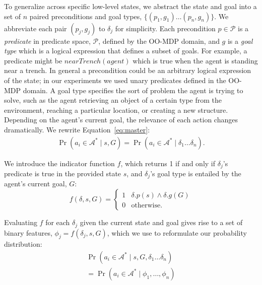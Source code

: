 \documentclass[letterpaper]{article}
\begin{document}
To generalize across specific low-level states, we abstract the state
and goal into a set of $n$ paired preconditions and goal types, $\{
(p_1, g_1) \ldots (p_{n}, g_{n}) \}$. We abbreviate each pair $(p_j,
g_j)$ to $\delta_j$ for simplicity. Each precondition $p \in
\mathcal{P}$ is a {\it predicate} in predicate space, $\mathcal{P}$,
defined by the OO-MDP domain, and $g$ is a {\it goal type} which is a
logical expression that defines a subset of goals. For example, a
predicate might be $nearTrench(agent)$ which is true when the agent is
standing near a trench.  In general a precondition could be an arbitrary
logical expression of the state; in our experiments we used unary
predicates defined in the OO-MDP domain.  A goal type specifies the
sort of problem the agent is trying to solve, such as the agent
retrieving an object of a certain type from the environment, reaching
a particular location, or creating a new structure.  Depending on the
agent's current goal, the relevance of each action changes
dramatically.  We rewrite Equation~\ref{eq:master}:
\begin{multline}
\Pr(a_i \in \mathcal{A}^* \mid s, G)
= \Pr(a_i \in \mathcal{A}^* \mid \delta_1 \ldots \delta_n).
\end{multline}

We introduce the indicator function $f$, which returns 1 if and only if $\delta_j$'s predicate is true in the provided state $s$, and $\delta_j$'s goal type is entailed by the agent's current goal, $G$:
\begin{equation}
f(\delta, s, G) = 
\begin{cases}
1& \delta.p(s) \wedge \delta.g(G) \\
0& \text{otherwise.}
\end{cases}
\label{eq:f_func_def}
\end{equation}

Evaluating $f$ for each $\delta_j$ given the current state and goal gives rise to a set of binary features,
$\phi_j = f(\delta_j, s, G)$, which we use to reformulate our probability distribution:
\begin{multline}
\Pr(a_i \in \mathcal{A}^*  \mid s, G, \delta_1 \ldots \delta_n) \\
= \Pr(a_i \in \mathcal{A}^*  \mid \phi_1, \ldots, \phi_n)
\label{eq:feature_rep}
\end{multline}
\end{document}
